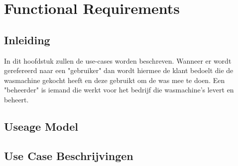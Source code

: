 \chapter{Functional Requirements}
\section{Inleiding}
In dit hoofdstuk zullen de use-cases worden beschreven.
Wanneer er wordt gerefereerd naar een "gebruiker" dan wordt hiermee de klant bedoelt die de wasmachine gekocht heeft en deze gebruikt om de was mee te doen.
Een "beheerder" is iemand die werkt voor het bedrijf die wasmachine's levert en beheert.
\newpage
\section{Useage Model}
\newpage
  


\section{Use Case Beschrijvingen}

